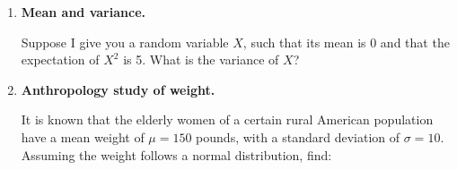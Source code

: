 \documentclass[12pt]{article}
\newif\ifsolutions
\begin{document}
\begin{enumerate}
\begin{enumerate}
        \item While the probability of finding at least one unusually successful test-taker increases with the sample size, this does not mean that psychic ability actually exists.
        \begin{itemize}
            \item In any large enough sample, \textbf{rare events happen by chance}.
            \item The correct way to test the existence of psychic abilities is not to rely on a single lucky individual, but rather to analyze whether successful test-takers continue to systematically outperform chance across repeated experiments.
            \item True psychics should consistently perform above chance levels, while lucky individuals who guessed well should regress to the mean in future trials.
            \item When testing collective, the threshold number of people who test positive for psychic abilities to consider that psychic abilities exist should increase along with the sample size.    
        \end{itemize}
    \end{enumerate}
    
    \fi \color{black}

    \item \textbf{Mean and variance.}
    
    Suppose I give you a random variable $X$, such that its mean is 0 and that the expectation of $X^2$ is 5. What is the variance of $X$?
    
    \ifsolutions \color{blue} \textbf{Solution:} \\
    
    \fi \color{black}
    

    \item \textbf{Anthropology study of weight.}
    
    It is known that the elderly women of a certain rural American population have a mean weight of \( \mu = 150 \) pounds, with a standard deviation of \( \sigma = 10 \). Assuming the weight follows a normal distribution, find:


\end{enumerate}
\end{document}
